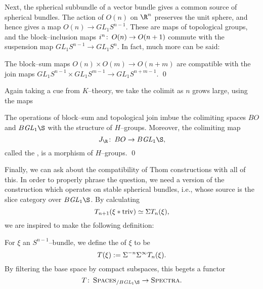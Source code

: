 Next, the spherical subbundle of a vector bundle gives a common source of spherical bundles.  The action of \(O(n)\) on \(\R^n\) preserves the unit sphere, and hence gives a map \(O(n) \to GL_1 S^{n-1}\).  These are maps of topological groups, and the block--inclusion maps \(i^n\colon\thinspace O(n) \to O(n+1)\) commute with the suspension map \(GL_1 S^{n-1} \to GL_1 S^n\).  In fact, much more can be said:
\begin{lemma}\label{JIsMonoidal}
The block--sum maps \(O(n) \times O(m) \to O(n+m)\) are compatible with the join maps \(GL_1 S^{n-1} \times GL_1 S^{m-1} \to GL_1 S^{n+m-1}\). \qed
\end{lemma}
\noindent Again taking a cue from \(K\)--theory, we take the colimit as \(n\) grows large, using the maps
\begin{center}
\end{center}
\begin{corollary}\label{DefnRealJHomomorphism}
The operations of block--sum and topological join imbue the colimiting spaces \(BO\) and \(B\GL_1 \S\) with the structure of \(H\)--groups.  Moreover, the colimiting map \[J_{\R}\co BO \to B\GL_1 \S,\] called the , is a morphism of \(H\)--groups. \qed
\end{corollary}
\noindent Finally, we can ask about the compatibility of Thom constructions with all of this.  In order to properly phrase the question, we need a version of the construction which operates on stable spherical bundles, i.e., whose source is the slice category over \(B\GL_1 \S\).  By calculating \[T_{n+1}(\xi \ast \text{triv}) \simeq \Sigma T_n(\xi),\] we are inspired to make the following definition:

\begin{definition}
For \(\xi\) an \(S^{n-1}\)--bundle, we define the  of \(\xi\) to be \[T(\xi) := \Sigma^{-n} \Sigma^\infty T_n(\xi).\]  By filtering the base space by compact subspaces, this begets a functor \[T\co \CatOf{Spaces}_{/ B\GL_1 \S} \to \CatOf{Spectra}.\]
\end{definition}


